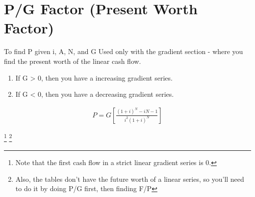 \documentclass{report} %
\begin{document}
\section*{P/G Factor (Present Worth Factor)}  
To find P given i, A, N, and G  
Used only with the gradient section - where you find the present worth of the linear cash flow.
\begin{enumerate}
    \item If G > 0, then you have a increasing gradient series.
    \item If G < 0, then you have a decreasing gradient series.
\end{enumerate}
\begin{equation*}
    \begin{aligned}
        P = G\left[\frac{(1+i)^N - iN -1}{i^2(1+i)^N}\right]
    \end{aligned}
\end{equation*}

\footnote{Note that the first cash flow in a strict linear gradient series is 0.}
\footnote{Also, the tables don't have the future worth of a linear series, so   you'll need to do it by doing P/G first, then finding F/P}
\end{document}
